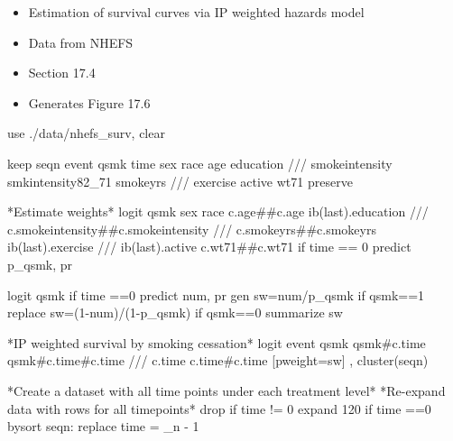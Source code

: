 \documentclass[
  10pt,
  a4paper,
]{book}
\newenvironment{Shaded}{\begin{snugshade}}{\end{snugshade}}
\newcommand{\BaseNTok}[1]{\textcolor[rgb]{0.68,0.00,0.00}{#1}}
\newcommand{\CommentTok}[1]{\textcolor[rgb]{0.37,0.37,0.37}{#1}}
\newcommand{\DataTypeTok}[1]{\textcolor[rgb]{0.68,0.00,0.00}{#1}}
\newcommand{\DecValTok}[1]{\textcolor[rgb]{0.68,0.00,0.00}{#1}}
\newcommand{\FunctionTok}[1]{\textcolor[rgb]{0.28,0.35,0.67}{#1}}
\newcommand{\KeywordTok}[1]{\textcolor[rgb]{0.00,0.46,0.62}{#1}}
\newcommand{\NormalTok}[1]{\textcolor[rgb]{0.00,0.46,0.62}{#1}}
\newcommand{\OtherTok}[1]{\textcolor[rgb]{0.00,0.46,0.62}{#1}}
\providecommand{\tightlist}{%
  \setlength{\itemsep}{0pt}\setlength{\parskip}{0pt}}
\begin{document}
\begin{itemize}
\tightlist
\item
  Estimation of survival curves via IP weighted hazards model
\item
  Data from NHEFS
\item
  Section 17.4
\item
  Generates Figure 17.6
\end{itemize}

\begin{Shaded}
\begin{Highlighting}[]
\KeywordTok{use}\NormalTok{ ./}\KeywordTok{data}\NormalTok{/nhefs\_surv, }\KeywordTok{clear}

\KeywordTok{keep}\NormalTok{ seqn event qsmk time sex race age education }\CommentTok{///}
\NormalTok{  smokeintensity smkintensity82\_71 smokeyrs }\CommentTok{///}
\NormalTok{  exercise active wt71}
\KeywordTok{preserve} 

\NormalTok{*Estimate weights*}
\KeywordTok{logit}\NormalTok{ qsmk sex race c.age\#\#c.age ib(}\FunctionTok{last}\NormalTok{).education }\CommentTok{///}
\NormalTok{  c.smokeintensity\#\#c.smokeintensity }\CommentTok{///}
\NormalTok{  c.smokeyrs\#\#c.smokeyrs ib(}\FunctionTok{last}\NormalTok{).exercise }\CommentTok{///}
\NormalTok{  ib(}\FunctionTok{last}\NormalTok{).active c.wt71\#\#c.wt71 }\KeywordTok{if}\NormalTok{ time == 0}
\KeywordTok{predict}\NormalTok{ p\_qsmk, pr}

\KeywordTok{logit}\NormalTok{ qsmk }\KeywordTok{if}\NormalTok{ time ==0 }
\KeywordTok{predict}\NormalTok{ num, pr}
\KeywordTok{gen} \KeywordTok{sw}\NormalTok{=num/p\_qsmk }\KeywordTok{if}\NormalTok{ qsmk==1}
\KeywordTok{replace} \KeywordTok{sw}\NormalTok{=(1{-}num)/(1{-}p\_qsmk) }\KeywordTok{if}\NormalTok{ qsmk==0}
\KeywordTok{summarize} \KeywordTok{sw}

\NormalTok{*IP weighted survival }\KeywordTok{by}\NormalTok{ smoking cessation*}
\KeywordTok{logit}\NormalTok{ event qsmk qsmk\#c.time qsmk\#c.time\#c.time }\CommentTok{///}
\NormalTok{  c.time c.time\#c.time [}\KeywordTok{pweight}\NormalTok{=}\KeywordTok{sw}\NormalTok{] , }\KeywordTok{cluster}\NormalTok{(seqn) }

\NormalTok{*Create a dataset with }\OtherTok{all}\NormalTok{ time points under each treatment }\DecValTok{level}\NormalTok{*}
\NormalTok{*Re{-}expand }\KeywordTok{data}\NormalTok{ with }\BaseNTok{rows} \KeywordTok{for} \OtherTok{all}\NormalTok{ timepoints*}
\KeywordTok{drop} \KeywordTok{if}\NormalTok{ time != 0}
\NormalTok{expand 120 }\KeywordTok{if}\NormalTok{ time ==0 }
\KeywordTok{bysort}\NormalTok{ seqn: }\KeywordTok{replace}\NormalTok{ time = }\DataTypeTok{\_n}\NormalTok{ {-} 1       }
        

\end{Highlighting}
\end{Shaded}
\end{document}
